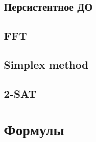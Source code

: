 \documentclass{article}
\begin{document}
\begin{multicols}{2}
\subsection{Персистентное ДО}

\subsection{FFT}

\subsection{Simplex method}

\subsection{2-SAT}

\end{multicols}
\newpage
\section{Формулы}
\end{document}
